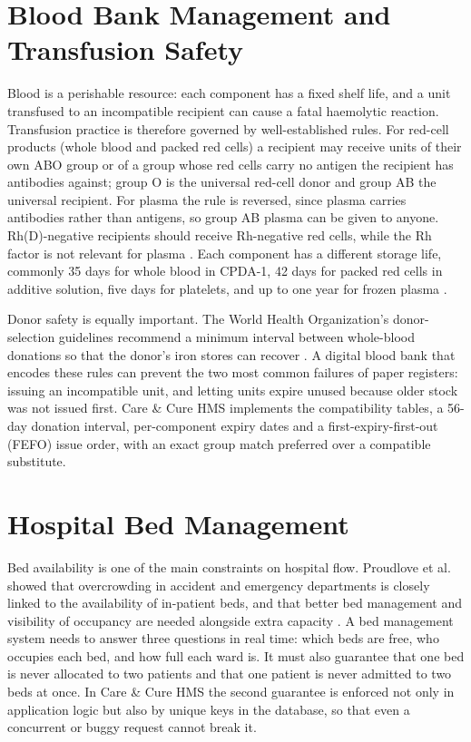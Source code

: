 \FloatBarrier
\section{Blood Bank Management and Transfusion Safety}

Blood is a perishable resource: each component has a fixed shelf life, and a unit transfused to an incompatible recipient can cause a fatal haemolytic reaction. Transfusion practice is therefore governed by well-established rules. For red-cell products (whole blood and packed red cells) a recipient may receive units of their own ABO group or of a group whose red cells carry no antigen the recipient has antibodies against; group O is the universal red-cell donor and group AB the universal recipient. For plasma the rule is reversed, since plasma carries antibodies rather than antigens, so group AB plasma can be given to anyone. Rh(D)-negative recipients should receive Rh-negative red cells, while the Rh factor is not relevant for plasma \cite{aabb2020}. Each component has a different storage life, commonly 35 days for whole blood in CPDA-1, 42 days for packed red cells in additive solution, five days for platelets, and up to one year for frozen plasma \cite{aabb2020}.

Donor safety is equally important. The World Health Organization's donor-selection guidelines recommend a minimum interval between whole-blood donations so that the donor's iron stores can recover \cite{who2012donor}. A digital blood bank that encodes these rules can prevent the two most common failures of paper registers: issuing an incompatible unit, and letting units expire unused because older stock was not issued first. Care \& Cure HMS implements the compatibility tables, a 56-day donation interval, per-component expiry dates and a first-expiry-first-out (FEFO) issue order, with an exact group match preferred over a compatible substitute.

\FloatBarrier
\section{Hospital Bed Management}

Bed availability is one of the main constraints on hospital flow. Proudlove et al. showed that overcrowding in accident and emergency departments is closely linked to the availability of in-patient beds, and that better bed management and visibility of occupancy are needed alongside extra capacity \cite{proudlove2003}. A bed management system needs to answer three questions in real time: which beds are free, who occupies each bed, and how full each ward is. It must also guarantee that one bed is never allocated to two patients and that one patient is never admitted to two beds at once. In Care \& Cure HMS the second guarantee is enforced not only in application logic but also by unique keys in the database, so that even a concurrent or buggy request cannot break it.

